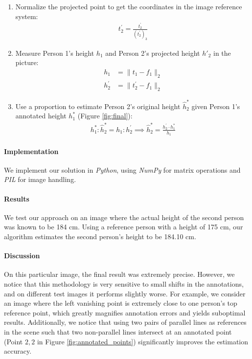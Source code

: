 \begin{enumerate}
    \item Normalize the projected point to get the coordinates in the image reference system:
    \begin{align*}
        t_2^{\prime} = \frac{t_2^{\prime}}{(t_2^{\prime})_3}
    \end{align*}

    \item Measure Person 1's height $h_1$ and Person 2's projected height $h'_2$ in the picture:
    \begin{align*}
        h_1 &= \|t_1 - f_1\|_2 \\
        h_2^{\prime} &= \|t_2^{\prime} - f_1\|_2
    \end{align*}

    \item Use a proportion to estimate Person 2's original height $\hat{h}^*_2$ given Person 1's annotated height $h^*_1$ (Figure \ref{fig:final}):
    \begin{align*}
       h^*_1 : \hat{h}^*_2 = h_1 : h_2^{\prime} \implies \hat{h}^*_2 = \frac{h_2^{\prime} \cdot h^*_1}{h_1}
    \end{align*}
    
\end{enumerate}

\paragraph{Implementation} We implement our solution in \textit{Python}, using \textit{NumPy} for matrix operations and \textit{PIL} for image handling.

\paragraph{Results} We test our approach on an image where the actual height of the second person was known to be 184 cm. Using a reference person with a height of 175 cm, our algorithm estimates the second person's height to be 184.10 cm.

\paragraph{Discussion} On this particular image, the final result was extremely precise. However, we notice that this methodology is very sensitive to small shifts in the annotations, and on different test images it performs slightly worse. For example, we consider an image where the left vanishing point is extremely close to one person's top reference point, which greatly magnifies annotation errors and yields suboptimal results. Additionally, we notice that using two pairs of parallel lines as references in the scene such that two non-parallel lines intersect at an annotated point (Point $2,2$ in Figure \ref{fig:annotated_points}) significantly improves the estimation accuracy.  

